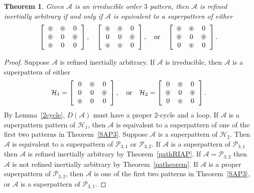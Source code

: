 \documentclass[10pt]{amsart}
\newtheorem{theorem}[proposition]{Theorem}
\begin{document}
\begin{theorem}\label{RIAP3}
Given ${\mathcal{A}}$ is an irreducible order $3$ pattern, then  
${\mathcal{A}}$ is refined inertially arbitrary   
if and only if ${\mathcal{A}}$ is equivalent to a superpattern of either 
$$\left[ \begin{array}{ccc}
{\circledast} & {\circledast} & 0 \\
{\circledast} & 0 & {\circledast} \\
{\circledast} & 0 & 0\end{array} \right], \quad 
\left[ \begin{array}{ccc}
{\circledast} & {\circledast} & 0 \\
0 & 0 & {\circledast} \\
{\circledast} & {\circledast} & 0\end{array} \right],\quad {\rm or} \quad 
\left[ \begin{array}{ccc}
{\circledast} & {\circledast} & 0 \\
{\circledast} & 0 & {\circledast} \\
0 & {\circledast} & 0 \end{array} \right].
$$
\end{theorem}

\begin{proof}
Suppose ${\mathcal{A}}$ is refined inertially arbitrary.
If ${\mathcal{A}}$ is irreducible, then ${\mathcal{A}}$ is a superpattern of either 
$${\mathcal{H}}_1=\left[ \begin{array}{ccc}
0 & {\circledast} & 0 \\
0 & 0 & {\circledast} \\
{\circledast} & 0 & 0\end{array} \right], \quad {\rm or} \quad 
{\mathcal{H}}_2=\left[ \begin{array}{ccc}
0 & {\circledast} & 0 \\
{\circledast} & 0 & {\circledast} \\
0 & {\circledast} & 0 \end{array} \right].
$$
By Lemma~\ref{2cycle}, $D({\mathcal{A}})$ must have a proper $2$-cycle and a loop. If
 ${\mathcal{A}}$ is a superpattern pattern of ${\mathcal{H}}_1$, then ${\mathcal{A}}$ is equivalent to a superpattern of one of the first two patterns
 in Theorem~\ref{SAP3}. Suppose ${\mathcal{A}}$ is a superpattern of ${\mathcal{H}}_2$. Then ${\mathcal{A}}$ is equivalent to a superpattern
 of ${\mathcal{P}}_{3,1}$ or ${\mathcal{P}}_{3,2}$. If ${\mathcal{A}}$ is a superpattern of ${\mathcal{P}}_{3,1}$ then ${\mathcal{A}}$ is 
 refined inertially arbitrary by Theorem~\ref{pathRIAP}.
  If ${\mathcal{A}}={\mathcal{P}}_{3,2}$  then ${\mathcal{A}}$ is not refined inertially arbitrary by Theorem~\ref{patheorem}. 
 If ${\mathcal{A}}$ is a proper superpattern of
 ${\mathcal{P}}_{3,2}$, then ${\mathcal{A}}$ is one of the first two patterns in Theorem~\ref{SAP3},
 or ${\mathcal{A}}$ is a superpattern of ${\mathcal{P}}_{3,1}$. 
\end{proof}
\end{document}
